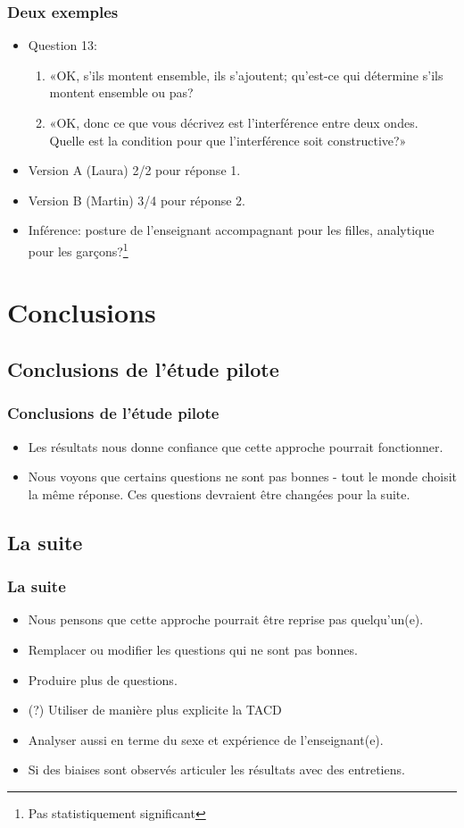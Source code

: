 \documentclass{beamer}
\begin{document}
\begin{frame}
  \frametitle{Deux exemples}
  \begin{itemize}
  \item Question 13:
    \begin{enumerate}
    \item «OK, s’ils montent ensemble, ils s’ajoutent; qu’est-ce qui détermine
      s’ils montent ensemble ou pas?
    \item «OK, donc ce que vous décrivez est l’interférence entre deux ondes.
      Quelle est la condition pour que l’interférence soit constructive?»   
      \end{enumerate}
  \item Version A (Laura) 2/2 pour réponse 1.
  \item Version B (Martin) 3/4 pour réponse 2.
  \item Inférence: posture de l'enseignant accompagnant pour les filles,
    analytique pour les garçons?\footnote{Pas statistiquement significant} 
  \end{itemize}
\end{frame}


\section{Conclusions}
\subsection{Conclusions de l'étude pilote}
\begin{frame}
\frametitle{Conclusions de l'étude pilote}
  \begin{itemize}
  \item Les résultats nous donne confiance que cette approche pourrait fonctionner.
  \item Nous voyons que certains questions ne sont pas bonnes - tout le monde
    choisit la même réponse. Ces questions devraient être changées pour la suite.
  \end{itemize}
\end{frame}

\subsection{La suite}
\begin{frame}
  \frametitle{La suite}
  \begin{itemize}
  \item Nous pensons que cette approche pourrait être reprise pas quelqu'un(e).
  \item Remplacer ou modifier les questions qui ne sont pas bonnes.
  \item Produire plus de questions.
    \item (?) Utiliser de manière plus explicite la TACD
  \item Analyser aussi en terme du sexe et expérience de l'enseignant(e).
    \item Si des biaises sont observés articuler les résultats avec des entretiens.
  \end{itemize}
\end{frame}
\end{document}
